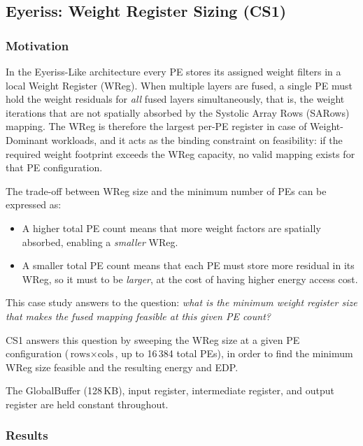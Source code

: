 \subsection{Eyeriss: Weight Register Sizing (CS1)}
\label{sec:eyeriss-cs1}

\subsubsection{Motivation}

In the Eyeriss-Like architecture every PE stores its assigned weight
filters in a local Weight Register (WReg).
When multiple layers are fused, a single PE must hold the weight
residuals for \emph{all} fused layers simultaneously, that is, the weight iterations
that are not spatially absorbed by the Systolic Array Rows (SARows) mapping.
The WReg is therefore the largest per-PE register in case of Weight-Dominant workloads, and it acts as the binding constraint on feasibility: if the required
weight footprint exceeds the WReg capacity, no valid mapping exists
for that PE configuration.

The trade-off between WReg size and the minimum number
of PEs can be expressed as:
%
\begin{itemize}
  \item A higher total PE count means that more weight factors are spatially absorbed, enabling a \emph{smaller} WReg.
  \item A smaller total PE count means that each PE must store more residual in its WReg, so it must to be \emph{larger}, at the cost of having higher energy access cost.
\end{itemize}

This case study answers to the question: \emph{what is the minimum weight register size that makes the
fused mapping feasible at this given PE count?}

CS1 answers this question by sweeping the WReg size at a given PE configuration ($\text{rows} \times \text{cols}$, up
to 16\,384 total PEs), in order to find the minimum WReg size feasible and the resulting energy and EDP.

The GlobalBuffer (128\,KB), input register, intermediate register, and
output register are held constant throughout.

\subsubsection{Results}

